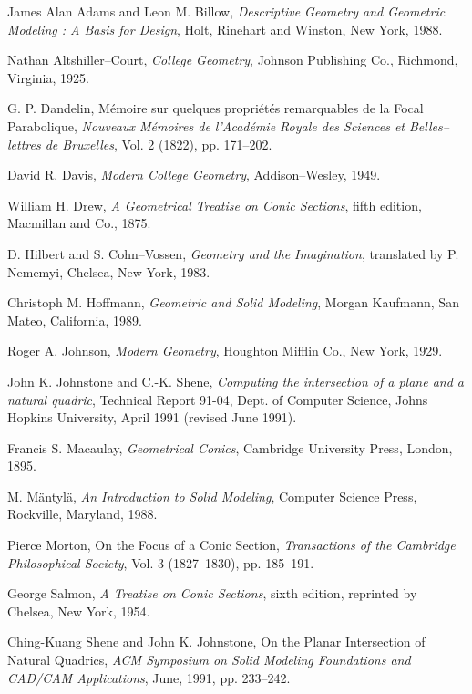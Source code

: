 \begin{thebibliography}{999}

     James Alan Adams and Leon M. Billow,
     {\em Descriptive Geometry and Geometric Modeling : A Basis for Design},
     Holt, Rinehart and Winston, New York, 1988.


     Nathan Altshiller--Court,
     {\em College Geometry},
     Johnson Publishing Co., Richmond, Virginia, 1925.

     G. P. Dandelin,
     M\'{e}moire sur quelques propri\'{e}t\'{e}s remarquables de la Focal
     Parabolique,
     {\em Nouveaux M\'{e}moires de l'Acad\'{e}mie Royale des Sciences et
     Belles--lettres de Bruxelles},
     Vol. 2 (1822), pp. 171--202.

     David R. Davis,
     {\em Modern College Geometry},
     Addison--Wesley, 1949.

     William H. Drew,
     {\em A Geometrical Treatise on Conic Sections},
     fifth edition,
     Macmillan and Co., 1875.

     D. Hilbert and S. Cohn--Vossen,
     {\em Geometry and the Imagination},
     translated by P. Nememyi,
     Chelsea, New York, 1983.

     Christoph M. Hoffmann,
     {\em Geometric and Solid Modeling},
     Morgan Kaufmann, San Mateo, California, 1989.

     Roger A. Johnson,
     {\em Modern Geometry},
     Houghton Mifflin Co., New York, 1929.

     John K. Johnstone and C.-K. Shene,
     {\em Computing the intersection of a plane and a natural quadric},
     Technical Report 91-04, Dept. of Computer Science, Johns Hopkins 
     University, April 1991 (revised June 1991).

     Francis S. Macaulay,
     {\em Geometrical Conics},
     Cambridge University Press, London, 1895.

     M. {M\"{a}ntyl\"{a}},
     {\em An Introduction to Solid Modeling},
     Computer Science Press, Rockville, Maryland, 1988.

     Pierce Morton,
     On the Focus of a Conic Section,
     {\em Transactions of the Cambridge Philosophical Society},
     Vol. 3 (1827--1830), pp. 185--191.

     George Salmon,
     {\em A Treatise on Conic Sections},
     sixth edition,
     reprinted by Chelsea, New York, 1954.

     Ching-Kuang Shene and John K. Johnstone,
     On the Planar Intersection of Natural Quadrics,
     {\em ACM Symposium on Solid Modeling Foundations and
     CAD/CAM Applications}, 
     June, 1991, pp. 233--242.

\end{thebibliography}



